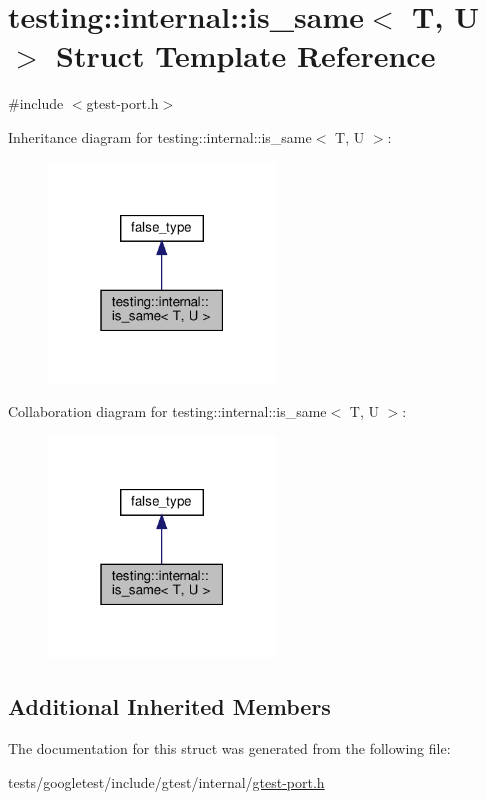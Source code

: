 \hypertarget{structtesting_1_1internal_1_1is__same}{}\section{testing\+:\+:internal\+:\+:is\+\_\+same$<$ T, U $>$ Struct Template Reference}
\label{structtesting_1_1internal_1_1is__same}


{\ttfamily \#include $<$gtest-\/port.\+h$>$}



Inheritance diagram for testing\+:\+:internal\+:\+:is\+\_\+same$<$ T, U $>$\+:\nopagebreak
\begin{figure}[H]
\begin{center}
\leavevmode
\includegraphics[width=171pt]{structtesting_1_1internal_1_1is__same__inherit__graph}
\end{center}
\end{figure}


Collaboration diagram for testing\+:\+:internal\+:\+:is\+\_\+same$<$ T, U $>$\+:\nopagebreak
\begin{figure}[H]
\begin{center}
\leavevmode
\includegraphics[width=171pt]{structtesting_1_1internal_1_1is__same__coll__graph}
\end{center}
\end{figure}
\subsection*{Additional Inherited Members}


The documentation for this struct was generated from the following file\+:\begin{DoxyCompactItemize}
\item 
tests/googletest/include/gtest/internal/\hyperlink{gtest-port_8h}{gtest-\/port.\+h}\end{DoxyCompactItemize}
